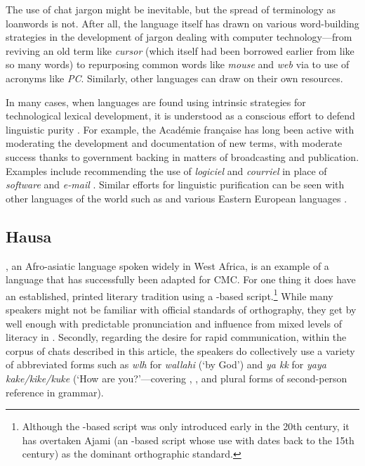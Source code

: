 \documentclass[output=paper
,newtxmath
,modfonts
,nonflat]{langsci/langscibook}
\begin{document}
The use of chat jargon might be inevitable, but the spread of terminology as loanwords is not. After all, the  language itself has drawn on various word-building strategies in the development of jargon dealing with computer technology—from reviving an old term like \textit{cursor} (which itself had been borrowed earlier from  like so many  words) to repurposing common words like \textit{mouse} and \textit{web} via  to use of acronyms like \textit{PC}. Similarly, other languages can draw on their own resources.

In many cases, when languages are found using intrinsic strategies for technological lexical development, it is understood as a conscious effort to defend linguistic purity \citep{blommaert2002,haspelmath2009}. For example, the Académie française has long been active with moderating the development and documentation of new  terms, with moderate success thanks to government backing in matters of broadcasting and publication. Examples include recommending the use of \textit{logiciel} and \textit{courriel} in place of \textit{software} and \textit{e-mail} \citep{daulton2012}. Similar efforts for linguistic purification can be seen with other languages of the world such as  and various Eastern European languages \citep{haspelmath2009}.

\subsection{Hausa}

, an Afro-asiatic language spoken widely in West Africa, is an example of a language that has successfully been adapted for CMC. For one thing it does have an established, printed literary tradition using a -based script.\footnote{Although the -based script was only introduced early in the 20th century, it has overtaken Ajami (an -based script whose use with  dates back to the 15th century) as the dominant orthographic standard.}  While many speakers might not be familiar with official standards of orthography, they get by well enough with predictable pronunciation and influence from mixed levels of literacy in . Secondly, regarding the desire for rapid communication, within the corpus of  chats described in this article, the  speakers do collectively use a variety of abbreviated forms such as \textit{wlh} for \textit{wallahi} (‘by God’) and \textit{ya kk} for \textit{yaya kake/kike/kuke} (‘How are you?’—covering , , and plural forms of second-person reference in  grammar).
\end{document}
